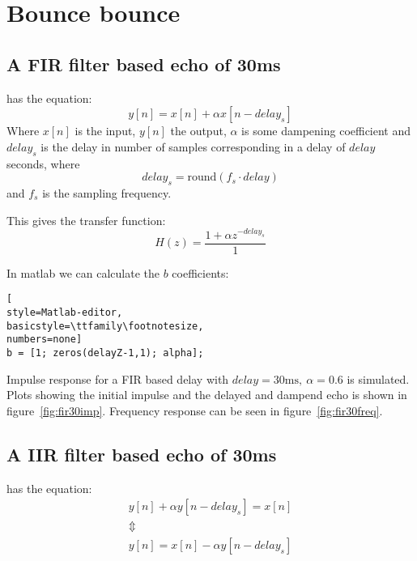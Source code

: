 \section{Bounce bounce}

\subsection{A FIR filter based echo of 30ms}
has the equation:
\begin{equation*}
y[n] = x[n] + \alpha x[n - delay_s]
\end{equation*}
Where $x[n]$ is the input, $y[n]$ the output, $\alpha$ is some dampening
coefficient and $delay_s$ is the delay in number of samples
corresponding in a delay of $delay$ seconds, where
\begin{equation*}
delay_s = \mbox{round}(f_s \cdot delay )
\end{equation*}
and $f_s$ is the sampling frequency.

This gives the transfer function:
\begin{equation*}
H(z) = \frac{1 + \alpha z^{-delay_s}}{ 1 }
\end{equation*}

In matlab we can calculate the $b$ coefficients:
\begin{lstlisting}[
style=Matlab-editor,
basicstyle=\ttfamily\footnotesize,
numbers=none]
b = [1; zeros(delayZ-1,1); alpha];
\end{lstlisting}

Impulse response for a FIR based delay with $delay = 30\mbox{ms}, ~ \alpha =
0.6$ is simulated. Plots showing the initial impulse and the delayed and dampend
echo is shown in figure~\ref{fig:fir30imp}. Frequency response can be seen in
figure~\ref{fig:fir30freq}.



\subsection{A IIR filter based echo of 30ms}
has the equation:
\begin{gather*}
y[n] + \alpha y[n - delay_s]= x[n] \\
\Updownarrow \\
y[n] = x[n] - \alpha y[n - delay_s]
\end{gather*}


